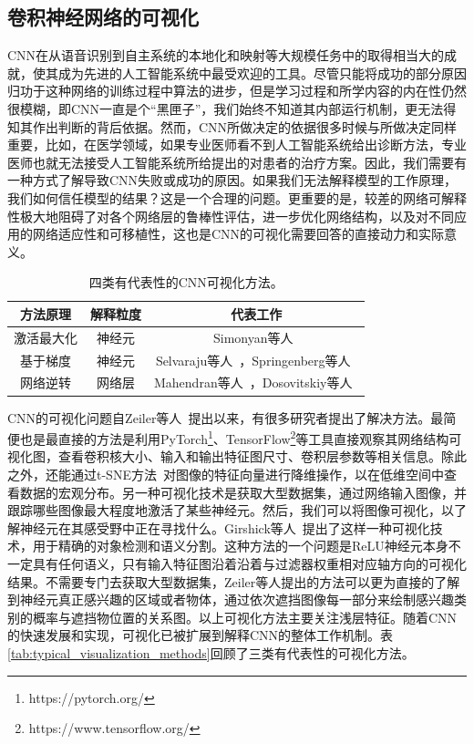 \subsection{卷积神经网络的可视化}\label{subsec:visulization_methods}
CNN在从语音识别到自主系统的本地化和映射等大规模任务中的取得相当大的成就，使其成为先进的人工智能系统中最受欢迎的工具。尽管只能将成功的部分原因归功于这种网络的训练过程中算法的进步，但是学习过程和所学内容的内在性仍然很模糊，即CNN一直是个“黑匣子”，我们始终不知道其内部运行机制，更无法得知其作出判断的背后依据。然而，CNN所做决定的依据很多时候与所做决定同样重要，比如，在医学领域，如果专业医师看不到人工智能系统给出诊断方法，专业医师也就无法接受人工智能系统所给提出的对患者的治疗方案。因此，我们需要有一种方式了解导致CNN失败或成功的原因。如果我们无法解释模型的工作原理，我们如何信任模型的结果？这是一个合理的问题。更重要的是，较差的网络可解释性极大地阻碍了对各个网络层的鲁棒性评估，进一步优化网络结构，以及对不同应用的网络适应性和可移植性，这也是CNN的可视化需要回答的直接动力和实际意义。
\begin{table}[h]
	\centering
	\caption[四类有代表性的CNN可视化方法]{四类有代表性的CNN可视化方法。}
	\label{tab:typical_visualization_methods}
	\begin{tabular}{c|c|c}
		\toprule[2pt]
		方法原理 & 解释粒度 & 代表工作 \\ \midrule[2pt]
		激活最大化 & 神经元  & Simonyan等人~\cite{simonyan2013deep}  \\\hline
		基于梯度 &  神经元 & Selvaraju等人~\cite{selvaraju2017grad}，Springenberg等人~\cite{springenberg2014striving} \\  \hline
		网络逆转 & 网络层 &Mahendran等人~\cite{mahendran2015understanding, mahendran2016visualizing}，Dosovitskiy等人~\cite{dosovitskiy2016inverting}\\
		\bottomrule[2pt]
	\end{tabular}
	\label{tab:four_visulization_types}
\end{table}

CNN的可视化问题自Zeiler等人~\cite{zeiler2014visualizing}提出以来，有很多研究者提出了解决方法。最简便也是最直接的方法是利用PyTorch\footnote{https://pytorch.org/}、TensorFlow\footnote{https://www.tensorflow.org/}等工具直接观察其网络结构可视化图，查看卷积核大小、输入和输出特征图尺寸、卷积层参数等相关信息。除此之外，还能通过t-SNE方法~\cite{maaten2008visualizing}对图像的特征向量进行降维操作，以在低维空间中查看数据的宏观分布。另一种可视化技术是获取大型数据集，通过网络输入图像，并跟踪哪些图像最大程度地激活了某些神经元。然后，我们可以将图像可视化，以了解神经元在其感受野中正在寻找什么。Girshick等人~\cite{girshick2014rich}提出了这样一种可视化技术，用于精确的对象检测和语义分割。这种方法的一个问题是ReLU神经元本身不一定具有任何语义，只有输入特征图沿着沿着与过滤器权重相对应轴方向的可视化结果。不需要专门去获取大型数据集，Zeiler等人提出的方法可以更为直接的了解到神经元真正感兴趣的区域或者物体，通过依次遮挡图像每一部分来绘制感兴趣类别的概率与遮挡物位置的关系图。以上可视化方法主要关注浅层特征。随着CNN的快速发展和实现，可视化已被扩展到解释CNN的整体工作机制。表\ref{tab:typical_visualization_methods}回顾了三类有代表性的可视化方法。
